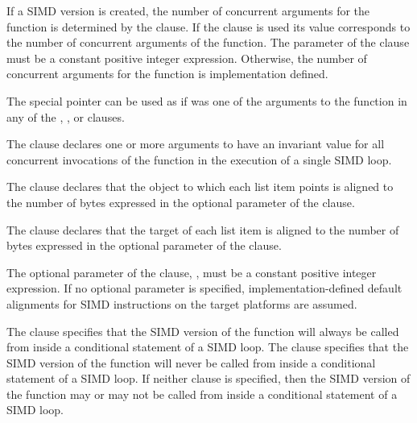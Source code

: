 If a SIMD version is created, the number of concurrent arguments for the function is 
determined by the  clause. If the  clause is used its value 
corresponds to the number of concurrent arguments of the function. The parameter of 
the  clause must be a constant positive integer expression. Otherwise, the 
number of concurrent arguments for the function is implementation defined.

\cppspecificstart
The special  pointer can be used as if was one of the arguments to the function in any of the , , or  clauses.
\cppspecificend

The  clause declares one or more arguments to have an invariant value for all 
concurrent invocations of the function in the execution of a single SIMD loop.

\begin{samepage}
\ccppspecificstart
The  clause declares that the object to which each list item points is aligned to 
the number of bytes expressed in the optional parameter of the  clause.
\ccppspecificend
\end{samepage}

\begin{samepage}
\fortranspecificstart
The  clause declares that the target of each list item is aligned to the number 
of bytes expressed in the optional parameter of the  clause.
\fortranspecificend
\end{samepage}

The optional parameter of the  clause, , must be a constant positive 
integer expression. If no optional parameter is specified, implementation-defined default 
alignments for SIMD instructions on the target platforms are assumed.

The  clause specifies that the SIMD version of the function will always be called from inside a 
conditional statement of a SIMD loop. The  clause specifies that the 
SIMD version of the function will never be called from inside a conditional statement of a SIMD loop. If 
neither clause is specified, then the SIMD version of the function may or may not be called from inside a 
conditional statement of a SIMD loop.

